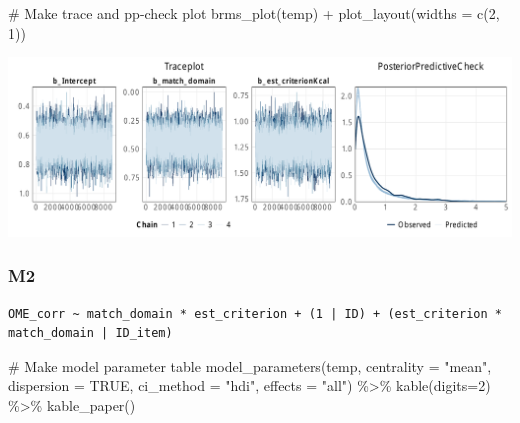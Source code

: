 \documentclass[
  letterpaper,
  DIV=11,
  numbers=noendperiod]{scrartcl}
\newenvironment{Shaded}{\begin{snugshade}}{\end{snugshade}}
\newcommand{\AttributeTok}[1]{\textcolor[rgb]{0.40,0.45,0.13}{#1}}
\newcommand{\CommentTok}[1]{\textcolor[rgb]{0.37,0.37,0.37}{#1}}
\newcommand{\ConstantTok}[1]{\textcolor[rgb]{0.56,0.35,0.01}{#1}}
\newcommand{\DecValTok}[1]{\textcolor[rgb]{0.68,0.00,0.00}{#1}}
\newcommand{\FunctionTok}[1]{\textcolor[rgb]{0.28,0.35,0.67}{#1}}
\newcommand{\NormalTok}[1]{\textcolor[rgb]{0.00,0.23,0.31}{#1}}
\newcommand{\OtherTok}[1]{\textcolor[rgb]{0.00,0.23,0.31}{#1}}
\newcommand{\SpecialCharTok}[1]{\textcolor[rgb]{0.37,0.37,0.37}{#1}}
\newcommand{\StringTok}[1]{\textcolor[rgb]{0.13,0.47,0.30}{#1}}
\begin{document}
\begin{Shaded}
\begin{Highlighting}[]
\CommentTok{\# Make trace and pp{-}check plot}
\FunctionTok{brms\_plot}\NormalTok{(temp) }\SpecialCharTok{+} \FunctionTok{plot\_layout}\NormalTok{(}\AttributeTok{widths =} \FunctionTok{c}\NormalTok{(}\DecValTok{2}\NormalTok{, }\DecValTok{1}\NormalTok{))}
\end{Highlighting}
\end{Shaded}

\includegraphics{supplement_files/figure-pdf/h3aM1-1.pdf}

\subsubsection{M2}\label{m2}

\begin{Shaded}
\end{Shaded}

\begin{verbatim}
OME_corr ~ match_domain * est_criterion + (1 | ID) + (est_criterion * match_domain | ID_item) 
\end{verbatim}

\begin{Shaded}
\begin{Highlighting}[]
\CommentTok{\# Make model parameter table}
\FunctionTok{model\_parameters}\NormalTok{(temp, }\AttributeTok{centrality =} \StringTok{"mean"}\NormalTok{, }\AttributeTok{dispersion =} \ConstantTok{TRUE}\NormalTok{, }
                 \AttributeTok{ci\_method =} \StringTok{"hdi"}\NormalTok{, }\AttributeTok{effects =} \StringTok{"all"}\NormalTok{) }\SpecialCharTok{\%\textgreater{}\%} 
  \FunctionTok{kable}\NormalTok{(}\AttributeTok{digits=}\DecValTok{2}\NormalTok{) }\SpecialCharTok{\%\textgreater{}\%} \FunctionTok{kable\_paper}\NormalTok{()}
\end{Highlighting}
\end{Shaded}
\end{document}
